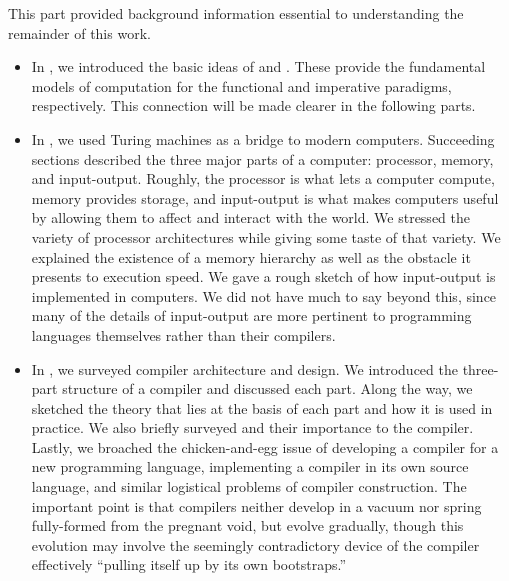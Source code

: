 \label{background:conclusion}
This part provided background information essential to understanding the remainder of this work.
\begin{itemize}
\item In , we introduced the basic ideas of \lambdacalc and \TMs. These provide the fundamental models of computation for the functional and imperative paradigms, respectively. This connection will be made clearer in the following parts.

\item In , we used Turing machines as a bridge to modern computers. Succeeding sections described the three major parts of a computer: processor, memory, and input-output. Roughly, the processor is what lets a computer compute, memory provides storage, and input-output is what makes computers useful by allowing them to affect and interact with the world. We stressed the variety of processor architectures while giving some taste of that variety. We explained the existence of a memory hierarchy as well as the obstacle it presents to execution speed. We gave a rough sketch of how input-output is implemented in computers. We did not have much to say beyond this, since many of the details of input-output are more pertinent to programming languages themselves rather than their compilers.

\item In , we surveyed compiler architecture and design. We introduced the three-part structure of a compiler and discussed each part. Along the way, we sketched the theory that lies at the basis of each part and how it is used in practice. We also briefly surveyed \IRs and their importance to the compiler. Lastly, we broached the chicken-and-egg issue of developing a compiler for a new programming language, implementing a compiler in its own source language, and similar logistical problems of compiler construction. The important point is that compilers neither develop in a vacuum nor spring fully-formed from the pregnant void, but evolve gradually, though this evolution may involve the seemingly contradictory device of the compiler effectively ``pulling itself up by its own bootstraps.''
\end{itemize}

